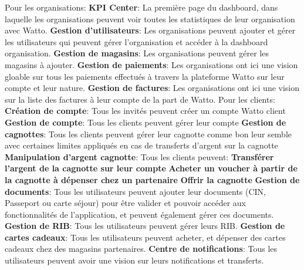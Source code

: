 \documentclass[../main.tex]{subfiles}
\begin{document}
\begin{outline}
\1 Pour les organisations: 
    \2 \textbf{KPI Center}: La première page du dashboard, dans laquelle les organisations peuvent voir toutes les statistiques de leur organisation avec Watto.
    \2 \textbf{Gestion d'utilisateurs}: Les organisations peuvent ajouter et gérer les utilisateurs qui peuvent gérer l'organisation et accéder à la dashboard organisation. 
    \2 \textbf{Gestion de magasins}: Les organisations peuvent gérer les magasins à ajouter.  
    \2 \textbf{Gestion de paiements}: Les organisations ont ici une vision gloable sur tous les paiements effectués à travers la plateforme Watto sur leur compte et leur nature.  
    \2 \textbf{Gestion de factures}: Les organisations ont ici une vision sur la liste des factures à leur compte de la part de Watto. 
 \1 Pour les clients: 
    \2 \textbf{Création de compte}: Tous les invités peuvent créer un compte Watto client 
    \2 \textbf{Gestion de compte}: Tous les clients peuvent gérer leur compte
    \2 \textbf{Gestion de cagnottes}: Tous les clients peuvent gérer leur cagnotte comme bon leur semble avec certaines limites appliqués en cas de transferts d'argent sur la cagnotte
    \2 \textbf{Manipulation d'argent cagnotte}: Tous les clients peuvent: 
        \3 \textbf{Transférer l'argent de la cagnotte sur leur compte} 
        \3 \textbf{Acheter un voucher à partir de la cagnotte à dépenser chez un partenaire} 
        \3 \textbf{Offrir la cagnotte}
    \2 \textbf{Gestion de documents}: Tous les utilisateurs peuvent ajouter leur documents (CIN, Passeport ou carte séjour) pour être valider et pouvoir accéder aux fonctionnalités de l'application, et peuvent également gérer ces documents. 
    \2 \textbf{Gestion de RIB}: Tous les utilisateurs peuvent gérer leurs RIB. 
    \2 \textbf{Gestion de cartes cadeaux}: Tous les utilisateurs peuvent acheter, et dépenser des cartes cadeaux chez des magasins partenaires. 
    \2 \textbf{Centre de notifications}: Tous les utilisateurs peuvent avoir une vision sur leurs notifications et transferts. 
\end{outline}
\end{document}
